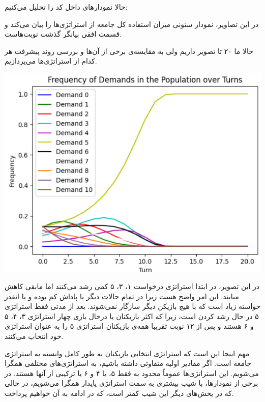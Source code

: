 حالا نمودارهای داخل کد را تحلیل می‌کنیم:

در این تصاویر، نمودار ستونی میزان استفاده کل جامعه از استراتژی‌ها را بیان می‌کند و قسمت افقی بیانگر گذشت نوبت‌هاست. 

حالا ما ۲۰ تا تصویر داریم ولی به مقایسه‌ی برخی از آن‌ها و بررسی روند پیشرفت هر کدام از استراتژی‌ها می‌پردازیم.

\begin{center}
	\includegraphics{1}
\end{center}

در این تصویر، در ابتدا استراتژی درخواست ۱، ۳، ۵ کمی رشد می‌کنند اما مابقی کاهش میابند. این امر واضح هست زیرا در تمام حالات دیگر یا پاداش کم بوده و یا انقدر خواسته زیاد است که با هیچ بازیکن دیگر سازگار نمی‌شوند. بعد از مدتی فقط استراتژی ۵ در حال رشد کردن است، زیرا که اکثر بازیکنان یا درحال بازی چهار استراتژی ۳، ۴، ۵ و ۶ هستند و پس از ۱۲ نوبت تقریبا همه‌ی بازیکنان استراتژی ۵ را به عنوان استراتژی خود انتخاب می‌کنند.

مهم اینجا این است که استراتژی انتخابی بازیکنان به طور کامل وابسته به استراتژی جامعه است. اگر مقادیر اولیه متفاوتی داشته باشیم، به استراتژی‌های مختلفی همگرا می‌شویم. این استراتژی‌ها عموماً محدود به فقط ۵، یا ۴ و ۶ یا ترکیبی از آنها هستند. در برخی از نمودارها، با شیب بیشتری به سمت استراتژی پایدار همگرا می‌شویم، در حالی که در بخش‌های دیگر این شیب کمتر است، که در ادامه به آن خواهیم پرداخت.

